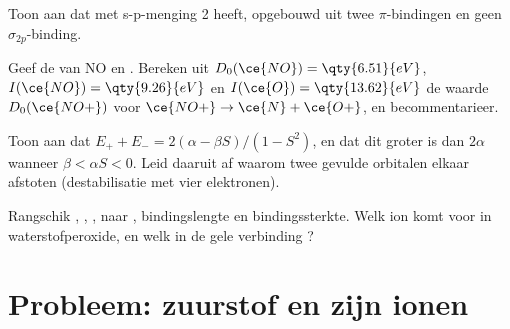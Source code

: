 \begin{exercise}[$\star\star$]\label{exo:b2:diatomic-mos:9}
Toon aan dat  met s-p-menging  2 heeft, opgebouwd uit twee $\pi$-bindingen en geen
$\sigma_{2p}$-binding.
\end{exercise}

\begin{exercise}[$\star\star\star$]\label{exo:b2:diatomic-mos:10}
Geef de  van NO en . Bereken uit $D_0(\ce{NO}) = \qty{6.51}{eV}$, $I(\ce{NO}) =
\qty{9.26}{eV}$ en $I(\ce{O}) = \qty{13.62}{eV}$ de waarde $D_0(\ce{NO+})$ voor $\ce{NO+} \to
\ce{N} + \ce{O+}$, en becommentarieer.
\end{exercise}

\begin{exercise}[$\star\star\star$]\label{exo:b2:diatomic-mos:11}
Toon aan dat $E_+ + E_- = 2(\alpha - \beta S)/(1 - S^2)$, en dat dit groter is dan $2\alpha$ wanneer
$\beta < \alpha S < 0$. Leid daaruit af waarom twee gevulde orbitalen elkaar afstoten (destabilisatie
met vier elektronen).
\end{exercise}

\begin{exercise}[$\star\star\star$]\label{exo:b2:diatomic-mos:12}
Rangschik , , ,  naar , bindingslengte en
bindingssterkte. Welk ion komt voor in waterstofperoxide, en welk in de gele
verbinding ?
\end{exercise}

\section{Probleem: zuurstof en zijn ionen}

